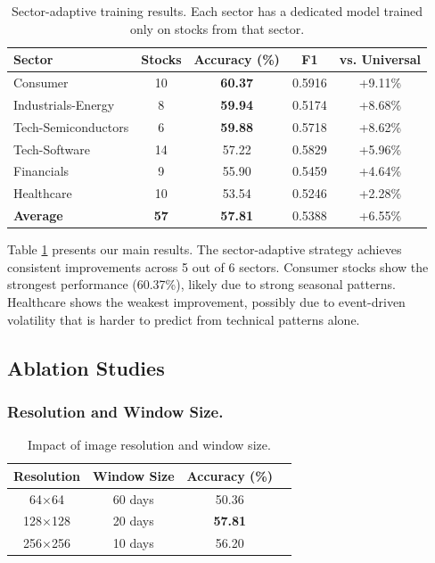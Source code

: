 \documentclass[runningheads]{llncs}
\begin{document}
\begin{table}[t]
\centering
\caption{Sector-adaptive training results. Each sector has a dedicated model trained only on stocks from that sector.}
\label{tab:sector}
\begin{tabular}{@{}lcccc@{}}
\toprule
\textbf{Sector} & \textbf{Stocks} & \textbf{Accuracy (\%)} & \textbf{F1} & \textbf{vs. Universal} \\
\midrule
Consumer & 10 & \textbf{60.37} & 0.5916 & +9.11\% \\
Industrials-Energy & 8 & \textbf{59.94} & 0.5174 & +8.68\% \\
Tech-Semiconductors & 6 & \textbf{59.88} & 0.5718 & +8.62\% \\
Tech-Software & 14 & 57.22 & 0.5829 & +5.96\% \\
Financials & 9 & 55.90 & 0.5459 & +4.64\% \\
Healthcare & 10 & 53.54 & 0.5246 & +2.28\% \\
\midrule
\textbf{Average} & \textbf{57} & \textbf{57.81} & 0.5388 & +6.55\% \\
\bottomrule
\end{tabular}
\end{table}

Table \ref{tab:sector} presents our main results. The sector-adaptive strategy achieves consistent improvements across 5 out of 6 sectors. Consumer stocks show the strongest performance (60.37\%), likely due to strong seasonal patterns. Healthcare shows the weakest improvement, possibly due to event-driven volatility that is harder to predict from technical patterns alone.

\subsection{Ablation Studies}
\label{sec:ablation}

\subsubsection{Resolution and Window Size.}

\begin{table}[h]
\centering
\caption{Impact of image resolution and window size.}
\label{tab:resolution}
\begin{tabular}{@{}cccc@{}}
\toprule
\textbf{Resolution} & \textbf{Window Size} & \textbf{Accuracy (\%)} \\
\midrule
64$\times$64 & 60 days & 50.36 \\
128$\times$128 & 20 days & \textbf{57.81} \\
256$\times$256 & 10 days & 56.20 \\
\bottomrule
\end{tabular}
\end{table}
\end{document}

